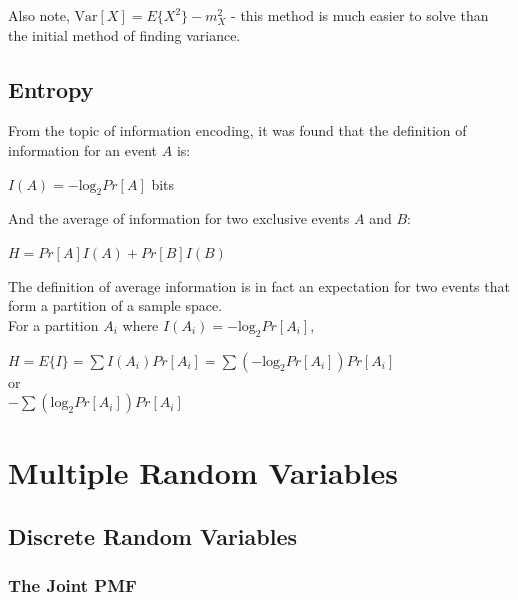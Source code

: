 \documentclass[11pt]{article}
\begin{document}
Also note, $\text{Var}[X] = E\{X^2\} - m_X^2$ - this method is much easier to solve than the initial method of finding variance.

\subsection{Entropy}

From the topic of information encoding, it was found that the definition of information for an event $A$ is: \\

\begin{center}
$I(A) = -\text{log}_2Pr[A]$ bits
\end{center}

And the average of information for two exclusive events $A$ and $B$:

\begin{center}
    $H = Pr[A]I(A) + Pr[B]I(B)$
\end{center}

The definition of average information is in fact an expectation for two events that form a partition of a sample space.\\

For a partition $A_i$ where $I(A_i) = -\text{log}_2Pr[A_i]$, \\

\begin{center}
    $H = E\{I\} = \sum I(A_i)Pr[A_i] = \sum(-\text{log}_2Pr[A_i])Pr[A_i]$ \\
    or \\
    
    $-\sum(\text{log}_2Pr[A_i])Pr[A_i]$
\end{center}

\pagebreak


\section{Multiple Random Variables}

\subsection{Discrete Random Variables}

\subsubsection{The Joint PMF}
\end{document}
